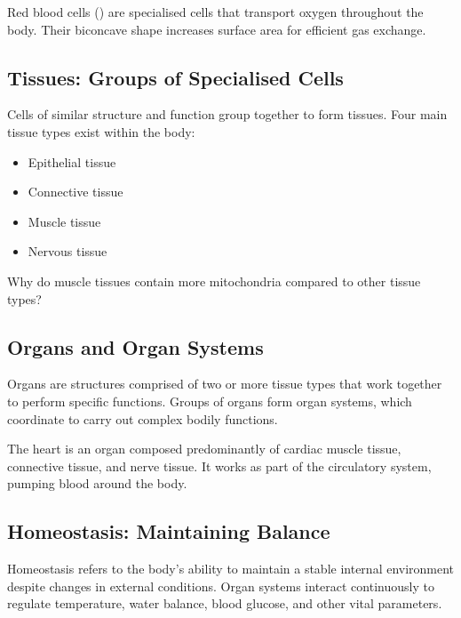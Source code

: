 \begin{example}
Red blood cells () are specialised cells that transport oxygen throughout the body. Their biconcave shape increases surface area for efficient gas exchange.
\end{example}

\subsection{Tissues: Groups of Specialised Cells}

Cells of similar structure and function group together to form tissues. Four main tissue types exist within the body:
\begin{itemize}
    \item Epithelial tissue
    \item Connective tissue
    \item Muscle tissue
    \item Nervous tissue
\end{itemize}

\begin{stopandthink}
Why do muscle tissues contain more mitochondria compared to other tissue types?
\end{stopandthink}

\subsection{Organs and Organ Systems}

Organs are structures comprised of two or more tissue types that work together to perform specific functions. Groups of organs form organ systems, which coordinate to carry out complex bodily functions.


\begin{example}
The heart is an organ composed predominantly of cardiac muscle tissue, connective tissue, and nerve tissue. It works as part of the circulatory system, pumping blood around the body.
\end{example}

\subsection{Homeostasis: Maintaining Balance}

Homeostasis refers to the body's ability to maintain a stable internal environment despite changes in external conditions. Organ systems interact continuously to regulate temperature, water balance, blood glucose, and other vital parameters.

